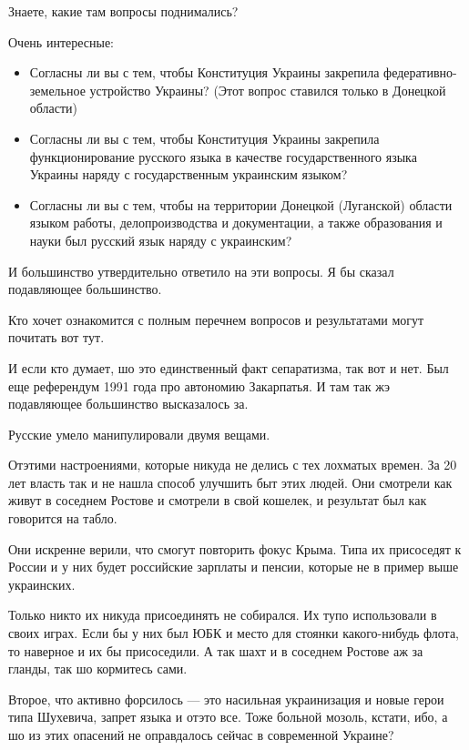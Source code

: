 Знаете, какие там вопросы поднимались?

Очень интересные:	

\begingroup
\bfseries\color{magenta}
\begin{itemize} %

\item Согласны ли вы с тем, чтобы Конституция Украины закрепила
федеративно-земельное устройство Украины? (Этот вопрос ставился только в
Донецкой области)

\item Согласны ли вы с тем, чтобы Конституция Украины закрепила
функционирование русского языка в качестве государственного языка Украины
наряду с государственным украинским языком?

\item Согласны ли вы с тем, чтобы на территории Донецкой (Луганской) области
языком работы, делопроизводства и документации, а также образования и науки был
русский язык наряду с украинским?

\end{itemize} %
\endgroup

И большинство утвердительно ответило на эти вопросы. Я бы сказал подавляющее
большинство.

Кто хочет ознакомится с полным перечнем вопросов и результатами могут почитать
вот тут.

И если кто думает, шо это единственный факт сепаратизма, так вот и нет. Был еще
референдум 1991 года про автономию Закарпатья. И там так жэ подавляющее
большинство высказалось за.

Русские умело манипулировали двумя вещами.

Отэтими настроениями, которые никуда не делись с тех лохматых времен. За 20 лет
власть так и не нашла способ улучшить быт этих людей. Они смотрели как живут в
соседнем Ростове и смотрели в свой кошелек, и результат был как говорится на
табло.

Они искренне верили, что смогут повторить фокус Крыма. Типа их присоседят к
России и у них будет российские зарплаты и пенсии, которые не в пример выше
украинских.

Только никто их никуда присоединять не собирался. Их тупо использовали в своих
играх. Если бы у них был ЮБК и место для стоянки какого-нибудь флота, то
наверное и их бы присоседили. А так шахт и в соседнем Ростове аж за гланды, так
шо кормитесь сами.

Второе, что активно форсилось — это насильная украинизация и новые герои типа
Шухевича, запрет языка и отэто все. Тоже больной мозоль, кстати, ибо, а шо из
этих опасений не оправдалось сейчас в современной Украине?

